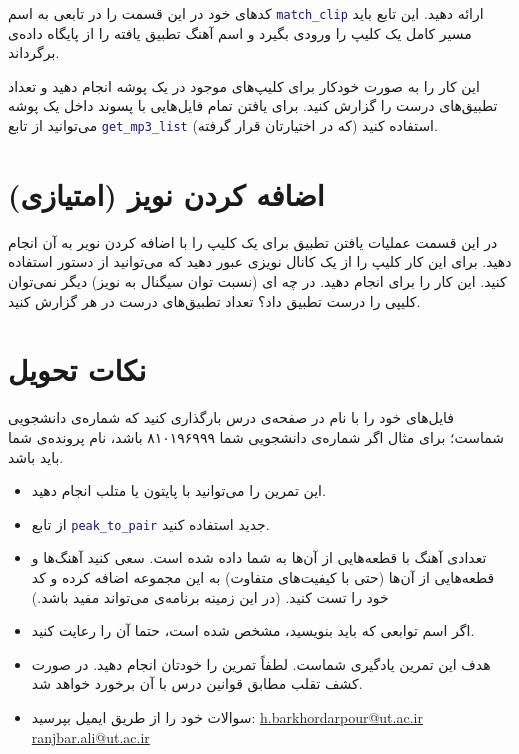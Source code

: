 \documentclass{utsignal}
\begin{document}
	کد‌های خود در این قسمت را در تابعی به اسم \lstinline[language=Matlab]{match_clip} ارائه دهید. این تابع باید مسیر کامل یک کلیپ را ورودی بگیرد و اسم آهنگ تطبیق یافته را از پایگاه داده‌ی  برگرداند.
	
	این کار را به صورت خودکار برای کلیپ‌های موجود در یک پوشه انجام دهید و تعداد تطبیق‌های درست را گزارش کنید. برای یافتن تمام فایل‌هایی با پسوند  داخل یک پوشه می‌توانید از تابع \lstinline[language=Matlab]{get_mp3_list} (که در اختیارتان قرار گرفته) استفاده کنید.
	
	\section{اضافه کردن نویز (امتیازی)}
	در این قسمت عملیات یافتن تطبیق برای یک کلیپ را با اضافه کردن نویر به آن انجام دهید. برای این کار کلیپ را از یک کانال نویزی عبور دهید که می‌توانید از دستور  استفاده کنید. این کار را برای  انجام دهید. در چه ای (نسبت توان سیگنال به نویز) دیگر نمی‌توان کلیپی را درست تطبیق داد؟ تعداد تطبیق‌های درست در هر  گزارش کنید.
	
	\section*{نکات تحویل}
	فایل‌های خود را با نام  در صفحه‌ی  درس بارگذاری کنید که  شماره‌ی دانشجویی شماست؛ برای مثال اگر شماره‌ی دانشجویی شما ۸۱۰۱۹۶۹۹۹ باشد، نام پرونده‌ی شما باید  باشد.
	\begin{itemize}
		\item این تمرین را می‌توانید با پایتون یا متلب انجام دهید.
		\item از تابع \lstinline[language=Matlab]{peak_to_pair} جدید استفاده کنید.
		\item تعدادی آهنگ با قطعه‌هایی از آن‌ها به شما داده شده است. سعی کنید آهنگ‌ها و قطعه‌هایی از آن‌ها (حتی با کیفیت‌های متفاوت) به این مجموعه اضافه کرده و کد خود را تست کنید. (در این زمینه برنامه‌ی  می‌تواند مفید باشد.)
		\item اگر اسم توابعی که باید بنویسید، مشخص شده است، حتما آن را رعایت کنید.
		\item هدف این تمرین یادگیری شماست. لطفاً تمرین را خودتان انجام دهید. در صورت کشف تقلب مطابق قوانین درس با آن برخورد خواهد شد.
		\item سوالات خود را از طریق ایمیل بپرسید:
		\subitem \href{mailto:h.barkhordarpour@ut.ac.ir?subject=[SS\%20S98 P1]}{h.barkhordarpour@ut.ac.ir}
		\subitem \href{mailto:ranjbar.ali@ut.ac.ir?subject=[SS\%20S98 P1]}{ranjbar.ali@ut.ac.ir}
	\end{itemize}
\end{document}
